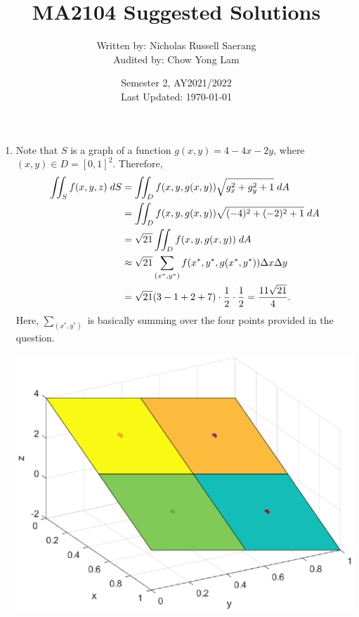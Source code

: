 \documentclass{article}
\title{MA2104 Suggested Solutions}
\author{Written by: Nicholas Russell Saerang\\Audited by: Chow Yong Lam}
\date{Semester 2, AY2021/2022\\Last Updated: \today}
\begin{document}
\maketitle

\begin{enumerate}
    \item Note that $S$ is a graph of a function $g(x,y)=4-4x-2y$, where $(x,y) \in D=[0,1]^2$. Therefore,
    \begin{align*}
        \iint_S f(x,y,z) \hspace{1mm}dS &= \iint_D f(x,y,g(x,y)) \sqrt{g_x^2 + g_y^2 + 1} \hspace{1mm}dA \\
        &= \iint_D f(x,y,g(x,y)) \sqrt{(-4)^2 + (-2)^2 + 1} \hspace{1mm}dA \\
        &= \sqrt{21} \iint_D f(x,y,g(x,y)) \hspace{1mm}dA \\
        &\approx \sqrt{21}\sum_{(x^*, y^*)} f(x^*, y^*, g(x^*,y^*)) \Delta x \Delta y \\
        &= \sqrt{21}(3-1+2+7)\cdot\frac{1}{2}\cdot\frac{1}{2} = \frac{11\sqrt{21}}{4}.
    \end{align*}
    Here, $\sum_{(x^*, y^*)}$ is basically summing over the four points provided in the question.
    
    \begin{center}
        \includegraphics[scale=0.7]{q1.eps}
    \end{center}
    \newpage
    
    

\end{enumerate}
\end{document}
